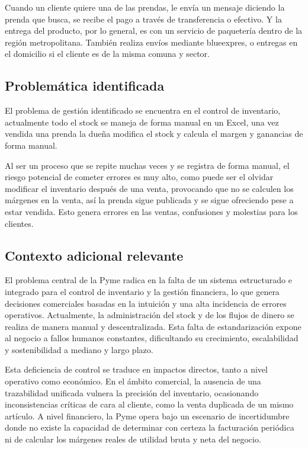 \documentclass[11pt,letterpaper]{article}
\begin{document}
Cuando un cliente quiere una de las prendas, le envía un mensaje diciendo la prenda que busca, se recibe el pago a través de transferencia o efectivo. Y la entrega del producto, por lo general, es con un servicio de paquetería dentro de la región metropolitana. También realiza envíos mediante blueexpres, o entregas en el domicilio si el cliente es de la misma comuna y sector. 

\subsection*{Problemática identificada}

El problema de gestión identificado se encuentra en el control de inventario, actualmente todo el stock se maneja de forma manual en un Excel, una vez vendida una prenda la dueña modifica el stock y calcula el margen y ganancias de forma manual. 

Al ser un proceso que se repite muchas veces y se registra de forma manual, el riesgo potencial de cometer errores es muy alto, como puede ser el olvidar modificar el inventario después de una venta, provocando que no se calculen los márgenes en la venta, así la prenda sigue publicada y se sigue ofreciendo pese a estar vendida. Esto genera errores en las ventas, confusiones y molestias para los clientes. 

\subsection*{Contexto adicional relevante}

El problema central de la Pyme radica en la falta de un sistema estructurado e integrado para el control de inventario y la gestión financiera, lo que genera decisiones comerciales basadas en la intuición y una alta incidencia de errores operativos. Actualmente, la administración del stock y de los flujos de dinero se realiza de manera manual y descentralizada. Esta falta de estandarización expone al negocio a fallos humanos constantes, dificultando su crecimiento, escalabilidad y sostenibilidad a mediano y largo plazo. 

Esta deficiencia de control se traduce en impactos directos, tanto a nivel operativo como económico. En el ámbito comercial, la ausencia de una trazabilidad unificada vulnera la precisión del inventario, ocasionando inconsistencias críticas de cara al cliente, como la venta duplicada de un mismo artículo. A nivel financiero, la Pyme opera bajo un escenario de incertidumbre donde no existe la capacidad de determinar con certeza la facturación periódica ni de calcular los márgenes reales de utilidad bruta y neta del negocio.
\end{document}
